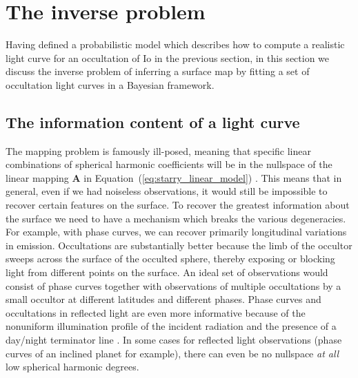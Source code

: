 \documentclass[12pt,dvipsnames]{report}
\begin{document}
\section{The inverse problem}
\label{sec:io_inverse_problem}
Having defined a probabilistic model which describes how to compute a realistic light curve for an occultation of Io in the previous section, in this section we discuss the inverse problem of inferring a surface map by fitting a set of occultation light curves in a Bayesian framework.

\subsection{The information content of a light curve}
\label{ssec:information_content}
The mapping problem is famously ill-posed, meaning that specific linear combinations of 
spherical harmonic coefficients will be in the nullspace of the linear mapping  
$\mathbf{A}$ in Equation~(\ref{eq:starry_linear_model}) \citep{2021AJ....162..123L}.
This means that in general, even if we had noiseless observations, it would still be impossible to recover certain features on the surface.
To recover the greatest information about the surface we need to have a mechanism which breaks the various degeneracies.
For example, with phase curves, we can recover primarily longitudinal variations in emission.
Occultations are substantially better because the limb of the occultor sweeps across the surface of the occulted sphere, thereby exposing or blocking light from different points on the surface.
An ideal set of observations would consist of phase curves together with observations of multiple occultations by a small occultor at different latitudes and different phases.
Phase curves and occultations in reflected light are even more informative because of the 
nonuniform illumination profile of the incident radiation and the presence of a day/night 
terminator line \citep{2022AJ....164....4L}.
In some cases for reflected light observations (phase curves of an inclined planet for example), there can even be no nullspace \emph{at all} low spherical harmonic degrees.
\end{document}
